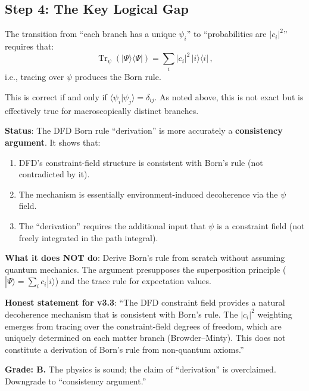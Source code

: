 \documentclass[11pt,a4paper]{article}
\newcommand{\Tr}{\operatorname{Tr}}
\begin{document}
\subsection{Step 4: The Key Logical Gap}

The transition from ``each branch has a unique $\psi_i$'' to ``probabilities are $|c_i|^2$'' requires that:
\begin{equation}
\Tr_\psi\left(|\Psi\rangle\langle\Psi|\right) = \sum_i |c_i|^2\,|i\rangle\langle i|\,,
\end{equation}
i.e., tracing over $\psi$ produces the Born rule.

This is correct if and only if $\langle\psi_i|\psi_j\rangle = \delta_{ij}$. As noted above, this is not exact but is effectively true for macroscopically distinct branches.

\begin{tcolorbox}[colback=yellow!5!white, colframe=yellow!60!black, title={Agent 4: Born Rule Audit}]
\textbf{Status}: The DFD Born rule ``derivation'' is more accurately a \textbf{consistency argument}. It shows that:
\begin{enumerate}
\item DFD's constraint-field structure is consistent with Born's rule (not contradicted by it).
\item The mechanism is essentially environment-induced decoherence via the $\psi$ field.
\item The ``derivation'' requires the additional input that $\psi$ is a constraint field (not freely integrated in the path integral).
\end{enumerate}

\textbf{What it does NOT do}: Derive Born's rule from scratch without assuming quantum mechanics. The argument presupposes the superposition principle ($|\Psi\rangle = \sum_i c_i |i\rangle$) and the trace rule for expectation values.

\textbf{Honest statement for v3.3}: ``The DFD constraint field provides a natural decoherence mechanism that is consistent with Born's rule. The $|c_i|^2$ weighting emerges from tracing over the constraint-field degrees of freedom, which are uniquely determined on each matter branch (Browder--Minty). This does not constitute a derivation of Born's rule from non-quantum axioms.''

\textbf{Grade: B.} The physics is sound; the claim of ``derivation'' is overclaimed. Downgrade to ``consistency argument.''
\end{tcolorbox}
\end{document}
